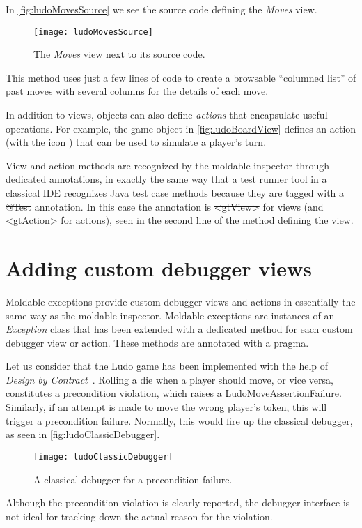 \documentclass[sigplan,anonymous,review,10pt]{acmart}
\newcommand*{\smallimg}[1]{%
    \raisebox{-.3\baselineskip}{%
        \texttt{[image: \#1]}%
    }%
}
\newcommand\ac[1]{\nbc{AC}{#1}{teal}}
\begin{document}
In \autoref{fig:ludoMovesSource} we see the source code defining the \emph{Moves} view.
\begin{figure}[h]
  \texttt{[image: ludoMovesSource]}
  \caption{The \emph{Moves} view next to its source code.}
  \label{fig:ludoMovesSource}
\end{figure}
This method uses just a few lines of code to create a browsable ``columned list'' of past moves with several columns for the details of each move.

In addition to views, objects can also define \emph{actions} that encapsulate useful operations.
For example, the game object in \autoref{fig:ludoBoardView} defines an  action (with the icon \smallimg{ludoPlayActionIcon}) that can be used to simulate a player's turn.


View and action methods are recognized by the moldable inspector through dedicated annotations, in exactly the same way that a test runner tool in a classical IDE recognizes Java test case methods because they are tagged with a \st{@Test} annotation.
In this case the annotation is \st{<gtView>} for views (and \st{<gtAction>} for actions), seen in the second line of the method defining the view.

\section{Adding custom debugger views}\label{sec:views}

Moldable exceptions provide custom debugger views and actions in essentially the same way as the moldable inspector.
Moldable exceptions are instances of an \emph{Exception} class that has been extended with a dedicated method for each custom debugger view or action.
These methods are annotated with a  pragma.

Let us consider that the Ludo game has been implemented with the help of \emph{Design by Contract}~\cite{Meye92b}.
Rolling a die when a player should move, or vice versa, constitutes a precondition violation, which raises a \st{LudoMoveAssertionFailure}.
Similarly, if an attempt is made to move the wrong player's token, this will trigger a precondition failure.
Normally, this would fire up the classical debugger, as seen in \autoref{fig:ludoClassicDebugger}.
\begin{figure}[h]
  \texttt{[image: ludoClassicDebugger]}
  \caption{A classical debugger for a precondition failure.}
  \label{fig:ludoClassicDebugger}
\end{figure}
Although the precondition violation is clearly reported, the debugger interface is not ideal for tracking down the actual reason for the violation.
\end{document}
